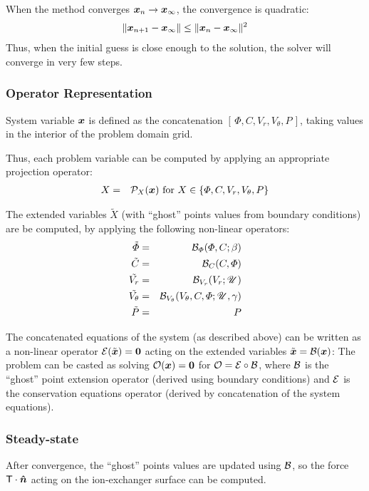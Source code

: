 When the method converges $\boldsymbol{x}_n \rightarrow \boldsymbol{x}_\infty$, 
the convergence is quadratic:
\begin{eqnarray}
\|\boldsymbol{x}_{n+1} - \boldsymbol{x}_\infty\| \le \|\boldsymbol{x}_{n} - \boldsymbol{x}_\infty\|^2
\end{eqnarray}
Thus, when the initial guess is close enough to the solution, the solver
will converge in very few steps.


\subsubsection{Operator Representation}
System variable $\boldsymbol{x}$ is defined as the concatenation $[\,\varPhi, C, V_r, V_\theta, P\,]$,
taking values in the interior of the problem domain grid.

Thus, each problem variable can be computed by applying an appropriate projection operator:
\begin{eqnarray}
X &=& \mathcal{P}_X(\boldsymbol{x}) \mbox{ for } X \in \left\{\varPhi, C, V_r, V_\theta, P\right\}
\end{eqnarray}

The extended variables $\tilde X$ (with ``ghost'' points values 
from boundary conditions) are be computed, by applying the following non-linear operators:
\begin{eqnarray}
\tilde{\varPhi} &=& \mathcal{B}_\varPhi(\varPhi, C; \beta) \\
\tilde{C} &=& \mathcal{B}_C(C, \varPhi) \\
\tilde{V_r} &=& \mathcal{B}_{V_r}(V_r; \mathscr{U}) \\
\tilde{V_\theta} &=& \mathcal{B}_{V_\theta}(V_\theta, C, \varPhi; \mathscr{U}, \gamma) \\
\tilde{P} &=& P
\end{eqnarray}

The concatenated equations of the system (as described above) can be written 
as a non-linear operator $\mathcal{E}(\tilde{\boldsymbol{x}}) = \boldsymbol{0}$ acting on the extended variables $\tilde{\boldsymbol{x}} = \mathcal{B}(\boldsymbol{x})$:
The problem can be casted as solving $\mathcal{O}(\boldsymbol{x}) = \boldsymbol{0}$ for $\mathcal{O} = \mathcal{E} \circ \mathcal{B}$,
where $\mathcal{B}$ is the ``ghost'' point extension operator (derived using boundary conditions) 
and $\mathcal{E}$ is the conservation equations operator (derived by concatenation of the system
equations).

\subsubsection{Steady-state}
After convergence, the ``ghost'' points values are updated using $\mathcal{B}$,
so the force $\mathsf{T} \cdot \boldsymbol{\hat{n}}$ acting on the ion-exchanger surface
can be computed.

